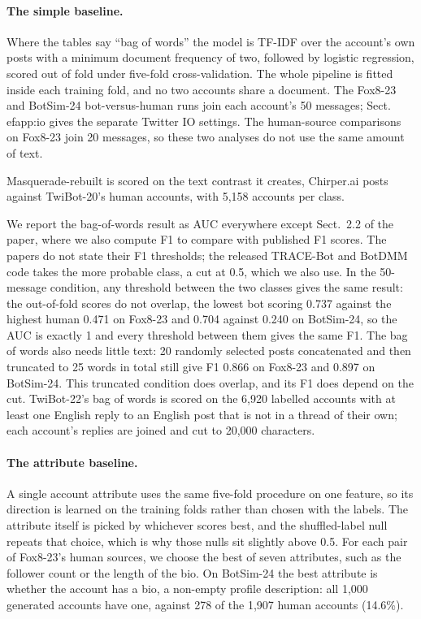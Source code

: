 \documentclass[10pt,a4paper]{article}
\begin{document}
\paragraph{The simple baseline.}
Where the tables say ``bag of words'' the model is TF-IDF over the account's own posts with
  a minimum document frequency of two, followed by logistic regression, scored out of fold
  under five-fold cross-validation.
The whole pipeline is fitted inside each training fold, and no two accounts share a document.
The Fox8-23 and BotSim-24 bot-versus-human runs join each account's 50 messages;
  Sect.~
ef{app:io} gives the separate Twitter IO settings.
The human-source comparisons on Fox8-23 join 20 messages, so these two analyses do not use the
  same amount of text.

Masquerade-rebuilt is scored on the text contrast it creates, Chirper.ai posts against TwiBot-20's
  human accounts, with 5,158 accounts per class.

We report the bag-of-words result as AUC everywhere except Sect.~2.2 of the paper, where we
  also compute F1 to compare with published F1 scores.
The papers do not state their F1 thresholds; the released TRACE-Bot and BotDMM code takes the
  more probable class, a cut at 0.5, which we also use.
In the 50-message condition, any threshold between the two classes gives the same result:
  the out-of-fold scores do not overlap,
  the lowest bot scoring 0.737 against the highest human 0.471 on Fox8-23 and 0.704 against 0.240
  on BotSim-24, so the AUC is exactly 1 and every threshold between them gives the same F1.
The bag of words also needs little text: 20 randomly selected posts concatenated and then
  truncated to 25 words in total still give F1 0.866 on Fox8-23 and 0.897 on BotSim-24.
This truncated condition does overlap, and its F1 does depend on the cut.
TwiBot-22's bag of words is scored on the 6,920 labelled accounts with at least one English reply to an English
  post that is not in a thread of their own; each account's replies are joined and cut to 20,000 characters.

\paragraph{The attribute baseline.}
A single account attribute uses the same five-fold procedure on one feature, so its direction is
  learned on the training folds rather than chosen with the labels.
The attribute itself is picked by whichever scores best, and the shuffled-label null repeats
  that choice, which is why those nulls sit slightly above 0.5.
For each pair of Fox8-23's human sources, we choose the best of seven attributes, such as the
  follower count or the length of the bio.
On BotSim-24 the best attribute is whether the account has a bio, a non-empty profile
  description: all 1,000 generated accounts have one, against 278 of the 1,907 human accounts
  (14.6\%).
\end{document}
